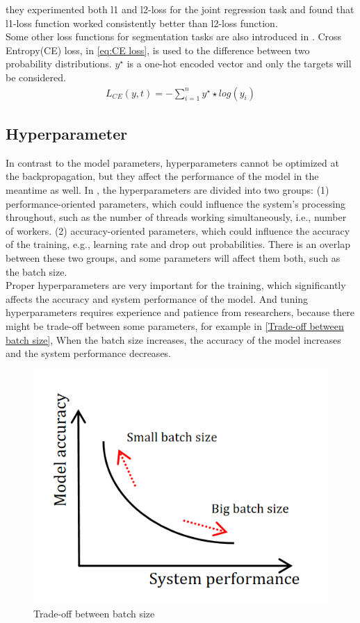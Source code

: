   they experimented both l1 and l2-loss for the joint regression task and found that l1-loss function worked consistently better than l2-loss function.\\
  Some other loss functions for segmentation tasks are also introduced in \cite{azad2023loss}. Cross Entropy(CE) loss, in \autoref{eq:CE loss}, is used to the difference between two
  probability distributions. $y^{\star}$ is a one-hot encoded vector and only the targets will be considered.
  \begin{align}
    L_{CE}(y,t) = -\sum_{i=1}^{n} y^{\star} \star log(y_{i})
     \label{eq:CE loss}
  \end{align}
  \subsection{Hyperparameter}
  In contrast to the model parameters, hyperparameters cannot be optimized at the backpropagation, but they affect the performance of the model in the meantime as well. 
  In \cite{4e568dfccc734aa6a8184f781bac6353}, the hyperparameters are divided into two groups: (1) performance-oriented parameters, which could influence the system's processing
  throughout, such as the number of threads working simultaneously, i.e., number of workers. (2) accuracy-oriented parameters, which could influence the accuracy of the training, e.g.,
  learning rate and drop out probabilities. There is an overlap between these two groups, and some parameters will affect them both, such as the batch size.\\
  Proper hyperparameters are very important for the training, which significantly affects the accuracy and system performance of the model. And tuning hyperparameters requires experience 
  and patience from researchers, because there might be trade-off between some parameters, for example in \autoref{Trade-off between batch size}, When the batch size increases, the 
  accuracy of the model increases and the system performance decreases.
  \begin{figure}
    \centering
    \includegraphics[width=0.6\linewidth]{example_images/batchSize}
    \caption{Trade-off between batch size}
    \label{Trade-off between batch size}
  \end{figure}